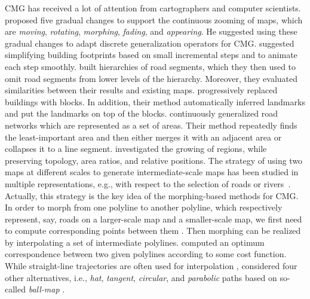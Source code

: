 CMG has received a lot of attention
from cartographers and computer scientists.
\Textcite{vanKreveld2001} proposed five gradual changes
to support the continuous zooming of maps, 
which are \emph{moving}, \emph{rotating}, \emph{morphing}, 
\emph{fading}, and \emph{appearing}. 
He suggested using these gradual changes 
to adapt discrete generalization operators for CMG.
\textcite{Sester2005_CG} suggested simplifying building
footprints based on small incremental steps and 
to animate each step smoothly.
\textcite{Li2012Continuous} built hierarchies of road segments,
which they then used to omit road segments 
from lower levels of the hierarchy.
Moreover, they evaluated similarities 
between their results and existing maps.
\textcite{Touya2017Progressive} progressively replaced
buildings with blocks. 
In addition, their method automatically inferred landmarks 
and put the landmarks on top of the blocks.
\textcite{Suba2016Road} continuously generalized road networks
which are represented as a set of areas.
Their method repeatedly finds the least-important area 
and then either merges it with an adjacent area 
or collapses it to a line segment.
\textcite{Danciger2009} investigated the growing of regions, 
while preserving topology, area ratios, and
relative positions.
The strategy of using two maps at different scales
to generate intermediate-scale maps has been studied in multiple
representations, e.g., with respect to the selection of roads or
rivers~\parencite{Peng2012River,Girres2014}. 
Actually, this strategy is the key idea of the
morphing-based methods for CMG.
In order to morph from one polyline to another polyline,
which respectively represent, say, roads on a larger-scale map 
and a smaller-scale map, we first need to compute 
corresponding points between them 
\parencite[e.g.,][]{Cecconi2003,Noellenburg2008,Chazal2010BallMap,
Deng2015,Li2017_Building,Li2017Annealing}.
Then morphing can be realized by interpolating a set of 
intermediate polylines.
\textcite{Noellenburg2008} computed an optimum
correspondence between two given polylines 
according to some cost function.
While straight-line trajectories 
are often used for interpolation
\parencite[e.g.,][]{Cecconi2003,Deng2015},
\textcite{Whited2011BallMorph} considered four other alternatives, 
i.e., \emph{hat}, \emph{tangent}, \emph{circular}, 
and \emph{parabolic} paths
based on so-called \emph{ball-map}
\parencite{Chazal2010BallMap}.
